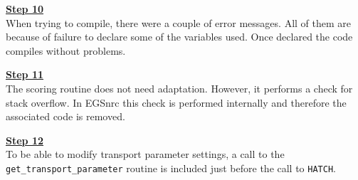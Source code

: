 \noindent
\underline{\bf Step 10} \hfill \\
When trying to compile, there were a couple of error messages. 
All of them are because of failure to declare some of the 
variables used. Once declared the code compiles without problems.

\noindent
\underline{\bf Step 11} \hfill \\
The scoring routine does not need adaptation. 
However, it performs a check for stack overflow. 
In EGSnrc this check is performed internally and 
therefore the associated code is removed. 

\noindent
\underline{\bf Step 12} \hfill \\
To be able to modify transport parameter settings, 
a call to the {\tt get\_transport\_parameter} 
routine is included just before the call to {\tt HATCH}.
 
